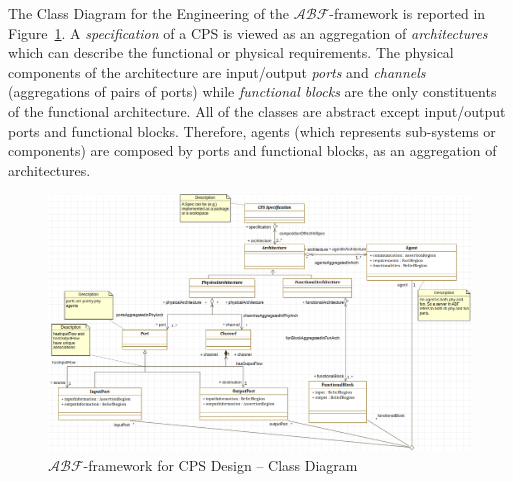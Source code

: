 \documentclass[conference]{IEEEtran}
\newcommand{\assertionRegion}{\mathcal{A}}
\newcommand{\beliefRegion}{\mathcal{B}}
\newcommand{\factRegion}{\mathcal{F}}
\newcommand{\abftheory}{\assertionRegion\beliefRegion\factRegion}
\begin{document}

\appendix
The Class Diagram for the Engineering of the $\abftheory$-framework is reported in
Figure~\ref{fig:secraclassdiagram}. A \emph{specification} of a CPS is viewed
as an aggregation of \emph{architectures} which can describe the functional or
physical requirements. The physical components of the architecture are
input/output \emph{ports} and \emph{channels} (aggregations of pairs of ports)
while \emph{functional blocks} are the only constituents of the functional
architecture. All of the classes are abstract except input/output ports and
functional blocks. Therefore, agents (which represents sub-systems or
components) are composed by ports and functional blocks, as an aggregation of 
architectures.

\begin{figure}
	\centering
	\includegraphics[width=\textwidth]{secra_classDiagram.png}
	\caption{$\abftheory$-framework for CPS Design -- Class Diagram}
	\label{fig:secraclassdiagram}
\end{figure}
\printbibliography


%
%
\end{document}
